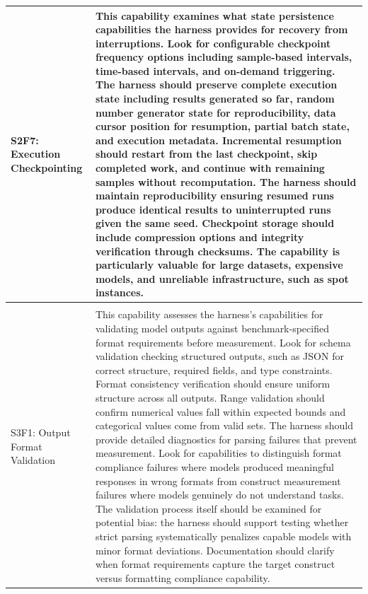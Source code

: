 \begin{longtable}{>{\raggedright\arraybackslash}p{3cm}|>{\raggedright\arraybackslash}p{16cm}}
S2F7: Execution Checkpointing & This capability examines what state persistence capabilities the harness provides for recovery from interruptions. Look for configurable checkpoint frequency options including sample-based intervals, time-based intervals, and on-demand triggering. The harness should preserve complete execution state including results generated so far, random number generator state for reproducibility, data cursor position for resumption, partial batch state, and execution metadata. Incremental resumption should restart from the last checkpoint, skip completed work, and continue with remaining samples without recomputation. The harness should maintain reproducibility ensuring resumed runs produce identical results to uninterrupted runs given the same seed. Checkpoint storage should include compression options and integrity verification through checksums. The capability is particularly valuable for large datasets, expensive models, and unreliable infrastructure, such as spot instances. \\
\hline

\multicolumn{2}{l}{\textbf{STAGE 3: MEASURE -- Scoring, Statistical Validation \& Comparative Analysis (7 capabilities)}} \\
\hline

S3F1: Output Format Validation & This capability assesses the harness's capabilities for validating model outputs against benchmark-specified format requirements before measurement. Look for schema validation checking structured outputs, such as JSON for correct structure, required fields, and type constraints. Format consistency verification should ensure uniform structure across all outputs. Range validation should confirm numerical values fall within expected bounds and categorical values come from valid sets. The harness should provide detailed diagnostics for parsing failures that prevent measurement. Look for capabilities to distinguish format compliance failures where models produced meaningful responses in wrong formats from construct measurement failures where models genuinely do not understand tasks. The validation process itself should be examined for potential bias: the harness should support testing whether strict parsing systematically penalizes capable models with minor format deviations. Documentation should clarify when format requirements capture the target construct versus formatting compliance capability. \\
\hline


\end{longtable}
